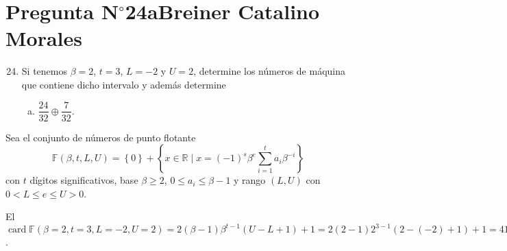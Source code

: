 \section{Pregunta N$^{\circ}$24a\qquad Breiner Catalino Morales}

\begin{frame}
	\begin{enumerate}\setcounter{enumi}{23}
		\item

		      Si tenemos $\beta=2$, $t=3$, $L=-2$ y $U=2$, determine los
		      números de máquina que contiene dicho intervalo y además
		      determine

		      \begin{enumerate}[b)]
			      \item

			            \begin{math}
				            \dfrac{24}{32}\oplus
				            \dfrac{7}{32}
			            \end{math}.
		      \end{enumerate}
	\end{enumerate}

	\begin{solution}
		\begin{definition}
			Sea el \alert{conjunto de números de punto flotante}
			\begin{equation*}
				\mathbb{F}\left(\beta,t,L,U\right)=
				\left\{0\right\}+
				\left\{
				x\in\mathbb{R}\mid
				x=
				\left(-1\right)^{s}
				\beta^{e}
				\sum_{i=1}^{t}a_{i}\beta^{-i}
				\right\}
			\end{equation*}
			con $t$ dígitos significativos, base $\beta\geq2$,
			$0\leq a_{i}\leq\beta-1$ y rango $\left(L,U\right)$ con
			$0<L\leq e\leq U>0$.
		\end{definition}

		El
		\begin{math}
			\operatorname{card}\mathbb{F}\left(\beta=2,t=3,L=-2,U=2\right)=
			2\left(\beta-1\right)\beta^{t-1}\left(U-L+1\right)+1=
			2\left(2-1\right)2^{3-1}\left(2-\left(-2\right)+1\right)+1=
			41
		\end{math}.
	\end{solution}
\end{frame}